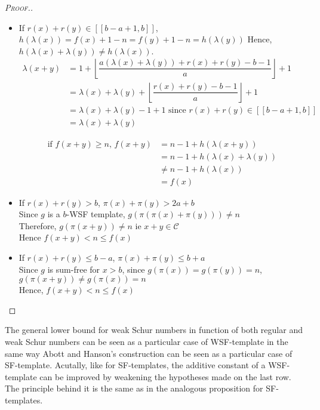 \begin{proof}[\textsc{Proof.}]
\begin{itemize}
\item If \(r(x)+r(y) \in [\![b-a+1,b]\!]\), \(h(\lambda(x))=f(x)+1-n=f(y)+1-n=h(\lambda(y))\)
Hence, \(h(\lambda(x)+\lambda(y)) \neq h(\lambda(x))\).
\begin{align*}
 \lambda(x+y) & =1+\left\lfloor\dfrac{a(\lambda(x)+\lambda(y))+r(x)+r(y)-b-1}{a}\right\rfloor+1\\
& = \lambda(x)+\lambda(y)+\left\lfloor\dfrac{r(x)+r(y)-b-1}{a}\right\rfloor+1 \\
& = \lambda(x)+\lambda(y) -1 +1 \text{ since } r(x)+r(y) \in [\![b-a+1,b]\!] \\
& =\lambda(x)+\lambda(y)
\end{align*}


\begin{align*}
 \text{if \(f(x+y) \geqslant n\), }f(x+y) & =n-1+h(\lambda(x+y))\\
& =n-1+h(\lambda(x)+\lambda(y)) \\
& \neq n-1+h(\lambda(x))\\
& =f(x)
\end{align*}


\item If \(r(x)+r(y)>b\), \(\pi(x)+\pi(y)>2a+b\)
\\Since \(g\) is a \(b\)-WSF template, \(g(\pi(\pi(x)+\pi(y))) \neq n\)
\\Therefore, \(g(\pi(x+y)) \neq n\) ie \(x+y \in \mathcal{C}\)
\\Hence \(f(x+y) <n\leqslant f(x)\)
\item If \(r(x)+r(y) \leqslant b - a\), \(\pi(x)+\pi(y)\leqslant b+a\)
\\Since \(g\) is sum-free for \(x>b\), since \(g(\pi(x)) = g(\pi(y))=n\), \(g(\pi(x+y)) \neq g(\pi(x))=n\)
\\Hence, \(f(x+y) <n\leqslant f(x)\)
\end{itemize}
\end{proof}

The general lower bound for weak Schur numbers in function of both regular and weak Schur numbers can be seen as a particular
case of WSF-template in the same way Abott and Hanson's construction can be seen as a particular case of SF-template. Acutally,
like for SF-templates, the additive constant of a WSF-template can be improved by weakening the hypotheses made on
the last row. The principle behind it is the same as in the analogous proposition for SF-templates.

